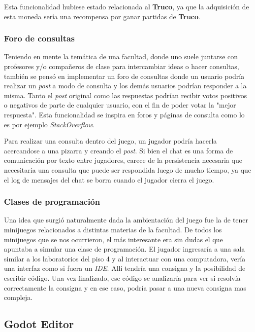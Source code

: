 Esta funcionalidad hubiese estado relacionada al \textbf{Truco}, ya que la adquisición de esta moneda
sería una recompensa por ganar partidas de \textbf{Truco}.

\subsubsection{Foro de consultas}
Teniendo en mente la temática de una facultad, donde uno suele juntarse con profesores y/o compañeros de clase
para intercambiar ideas o hacer consultas, también se pensó en implementar un foro de consultas donde un usuario
podría realizar un \textit{post} a modo de consulta y los demás usuarios podrían responder a la misma. Tanto el \textit{post}
original como las respuestas podrían recibir votos positivos o negativos de parte de cualquier usuario, con el fin
de poder votar la "mejor respuesta". Esta funcionalidad se inspira en foros y páginas de consulta como lo es por ejemplo
\textit{StackOverflow}.

Para realizar una consulta dentro del juego, un jugador podría hacerla acercandose a una pizarra y creando el \textit{post}.
Si bien el chat es una forma de comunicación por texto entre jugadores, carece de la persistencia necesaria que necesitaría
una consulta que puede ser respondida luego de mucho tiempo, ya que el log de mensajes del chat se borra cuando el jugador
cierra el juego.

\subsubsection{Clases de programación}
Una idea que surgió naturalmente dada la ambientación del juego fue la de tener minijuegos relacionados a distintas materias
de la facultad. De todos los minijuegos que se nos ocurrieron, el más interesante era sin dudas el que apuntaba a simular
una clase de programación. El jugador ingresaría a una sala similar a los laboratorios del piso 4 y al interactuar con una
computadora, vería una interfaz como si fuera un \textit{IDE}. Allí tendría una consigna y la posibilidad de escribir código.
Una vez finalizado, ese código se analizaría para ver si resolvía correctamente la consigna y en ese caso, podría pasar a una nueva
consigna mas compleja.


\subsection{Godot Editor}

